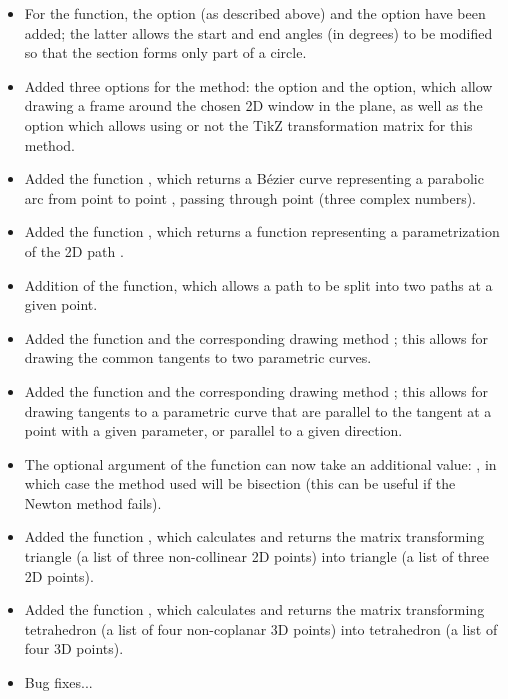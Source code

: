 \begin{itemize}
    \item For the  function, the  option (as described above) and the  option have been added; the latter allows the start and end angles (in degrees) to be modified so that the section forms only part of a circle.
    
    \item Added three options for the  method: the  option and the  option, which allow drawing a frame around the chosen 2D window in the plane, as well as the  option which allows using or not the TikZ transformation matrix for this method.

    \item Added the function , which returns a Bézier curve representing a parabolic arc from point  to point , passing through point  (three complex numbers).

    \item Added the function , which returns a function representing a parametrization of the 2D path .
    
    \item Addition of the  function, which allows a path to be split into two paths at a given point.    

    \item Added the function  and the corresponding drawing method ; this allows for drawing the common tangents to two parametric curves.

    \item Added the function  and the corresponding drawing method ; this allows for drawing tangents to a parametric curve that are parallel to the tangent at a point with a given parameter, or parallel to a given direction.

    \item The optional argument of the  function can now take an additional value: , in which case the method used will be bisection (this can be useful if the Newton method fails).
    
    \item Added the function , which calculates and returns the matrix transforming triangle  (a list of three non-collinear 2D points) into triangle  (a list of three 2D points). 

    \item Added the function , which calculates and returns the matrix transforming tetrahedron  (a list of four non-coplanar 3D points) into tetrahedron  (a list of four 3D points).
    
    \item Bug fixes...    
\end{itemize}

